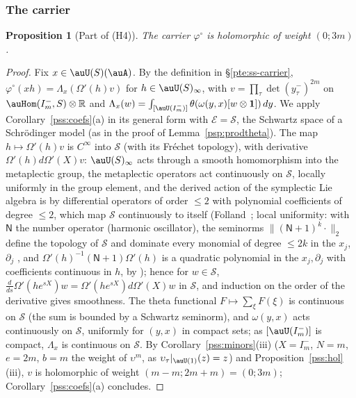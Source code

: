 \documentclass[10pt]{amsart}
\newtheorem{proposition}[theorem]{Proposition}
\theoremstyle{definition}
\theoremstyle{remark}
\newcommand{\R}{\mathbb R}
\begin{document}
\subsubsection{The carrier}\label{pss:ss-carrier}

\begin{proposition}[Part of (H4)]\label{pss:carrier}
The carrier $\varphi^\circ$ is holomorphic of weight $(0;3m)$.
\end{proposition}
\begin{proof}
Fix $x\in\auU(S)(\auA)$. By the definition in \S\ref{pte:ss-carrier},
$\varphi^\circ(xh)=\Lambda_x(\Omega'(h)v)$ for $h\in\auU(S)_\infty$, with $v=\prod_\tau\det(y^-_\tau)^{2m}$ on
$\auHom(I_m^-,S)\otimes\R$ and $\Lambda_x(w)=\int_{[\auU(I_m^-)]}\theta(\omega(y,x)[w\otimes\mathbf 1])\,dy$. We apply Corollary~\ref{pss:coefs}(a) in its general form with
$\mathcal E=\mathcal S$, the Schwartz space of a Schr\"odinger model (as in the proof of Lemma~\ref{psp:prodtheta}).
The map $h\mapsto\Omega'(h)v$ is $C^\infty$ into $\mathcal S$ (with its Fr\'echet topology), with derivative
$\Omega'(h)d\Omega'(X)v$: $\auU(S)_\infty$ acts through a smooth homomorphism into the metaplectic group, the
metaplectic operators act continuously on $\mathcal S$, locally uniformly in the group element, and the derived
action of the symplectic Lie algebra is by differential operators of order $\le2$ with polynomial coefficients of
degree $\le2$, which map $\mathcal S$ continuously to itself (Folland~\cite[Ch.~4, Prop.~4.27, Thm.~4.45 and (4.44)]{FollandPS}; local uniformity: with $\mathsf N$ the number operator (harmonic oscillator), the seminorms $\|(\mathsf N+1)^k\cdot\|_2$ define the topology of $\mathcal S$ and dominate every monomial of degree $\le2k$ in the $x_j$, $\partial_j$ \cite[Appendix to \S V.3, Lemmas~1--2]{ReedSimonI}, and $\Omega'(h)^{-1}(\mathsf N+1)\Omega'(h)$ is a quadratic polynomial in the $x_j,\partial_j$ with coefficients continuous in $h$, by \cite[(4.23)]{FollandPS}); hence for
$w\in\mathcal S$, $\frac d{ds}\Omega'(he^{sX})w=\Omega'(he^{sX})d\Omega'(X)w$ in $\mathcal S$, and induction on the
order of the derivative gives smoothness. The theta functional
$F\mapsto\sum_\xi F(\xi)$ is continuous on $\mathcal S$ (the sum is bounded by a Schwartz seminorm), and
$\omega(y,x)$ acts continuously on $\mathcal S$, uniformly for $(y,x)$ in compact sets; as $[\auU(I_m^-)]$ is compact,
$\Lambda_x$ is continuous on $\mathcal S$. By Corollary~\ref{pss:minors}(iii) ($X=I_m^-$, $N=m$, $e=2m$,
$b=m$ the weight of $\upsilon^m$, as $\upsilon_\tau|_{\auU(1)}(z)=z$) and Proposition~\ref{pss:hol}(iii), $v$ is
holomorphic of weight $(m-m;2m+m)=(0;3m)$; Corollary~\ref{pss:coefs}(a) concludes.
\end{proof}
\end{document}
